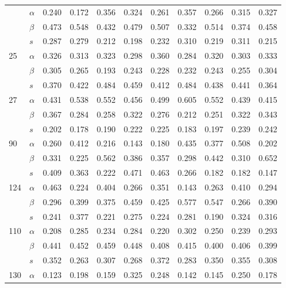 \begin{longtable}{llrrrrrrrrr}
\bottomrule
\endlastfoot
\multirow{3}{*}{76} & $\alpha$ & 0.240 & 0.172 & 0.356 & 0.324 & 0.261 & 0.357 & 0.266 & 0.315 & 0.327 \\
       & $\beta$ & 0.473 & 0.548 & 0.432 & 0.479 & 0.507 & 0.332 & 0.514 & 0.374 & 0.458 \\
       & $s$ & 0.287 & 0.279 & 0.212 & 0.198 & 0.232 & 0.310 & 0.219 & 0.311 & 0.215 \\
\cline{1-11}
\multirow{3}{*}{25} & $\alpha$ & 0.326 & 0.313 & 0.323 & 0.298 & 0.360 & 0.284 & 0.320 & 0.303 & 0.333 \\
       & $\beta$ & 0.305 & 0.265 & 0.193 & 0.243 & 0.228 & 0.232 & 0.243 & 0.255 & 0.304 \\
       & $s$ & 0.370 & 0.422 & 0.484 & 0.459 & 0.412 & 0.484 & 0.438 & 0.441 & 0.364 \\
\cline{1-11}
\multirow{3}{*}{27} & $\alpha$ & 0.431 & 0.538 & 0.552 & 0.456 & 0.499 & 0.605 & 0.552 & 0.439 & 0.415 \\
       & $\beta$ & 0.367 & 0.284 & 0.258 & 0.322 & 0.276 & 0.212 & 0.251 & 0.322 & 0.343 \\
       & $s$ & 0.202 & 0.178 & 0.190 & 0.222 & 0.225 & 0.183 & 0.197 & 0.239 & 0.242 \\
\cline{1-11}
\multirow{3}{*}{90} & $\alpha$ & 0.260 & 0.412 & 0.216 & 0.143 & 0.180 & 0.435 & 0.377 & 0.508 & 0.202 \\
       & $\beta$ & 0.331 & 0.225 & 0.562 & 0.386 & 0.357 & 0.298 & 0.442 & 0.310 & 0.652 \\
       & $s$ & 0.409 & 0.363 & 0.222 & 0.471 & 0.463 & 0.266 & 0.182 & 0.182 & 0.147 \\
\cline{1-11}
\multirow{3}{*}{124} & $\alpha$ & 0.463 & 0.224 & 0.404 & 0.266 & 0.351 & 0.143 & 0.263 & 0.410 & 0.294 \\
       & $\beta$ & 0.296 & 0.399 & 0.375 & 0.459 & 0.425 & 0.577 & 0.547 & 0.266 & 0.390 \\
       & $s$ & 0.241 & 0.377 & 0.221 & 0.275 & 0.224 & 0.281 & 0.190 & 0.324 & 0.316 \\
\cline{1-11}
\multirow{3}{*}{110} & $\alpha$ & 0.208 & 0.285 & 0.234 & 0.284 & 0.220 & 0.302 & 0.250 & 0.239 & 0.293 \\
       & $\beta$ & 0.441 & 0.452 & 0.459 & 0.448 & 0.408 & 0.415 & 0.400 & 0.406 & 0.399 \\
       & $s$ & 0.352 & 0.263 & 0.307 & 0.268 & 0.372 & 0.283 & 0.350 & 0.355 & 0.308 \\
\cline{1-11}
\multirow{3}{*}{130} & $\alpha$ & 0.123 & 0.198 & 0.159 & 0.325 & 0.248 & 0.142 & 0.145 & 0.250 & 0.178 \\

\end{longtable}
